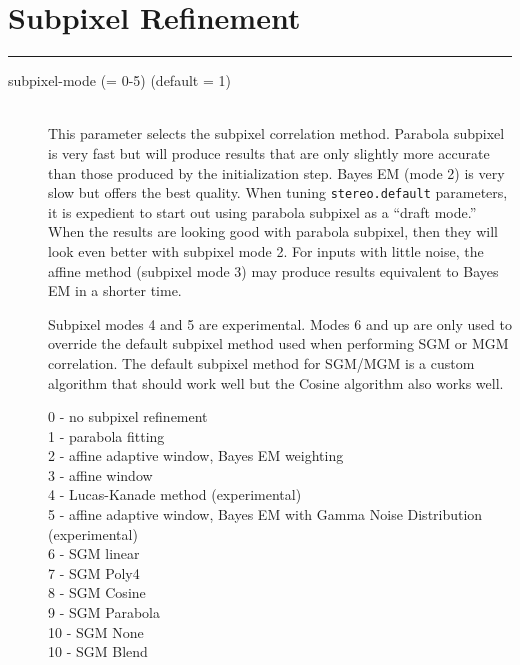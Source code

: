 \section{Subpixel Refinement}
\hrule
\bigskip

\begin{description}

\item[subpixel-mode \textnormal{\small{(= 0-5)}} (default = 1)] \hfill \\
  This parameter selects the subpixel correlation method. Parabola subpixel
  is very fast but will produce results that are only slightly more accurate
   than those produced by the initialization step. Bayes EM (mode 2)
  is very slow but offers the best quality. When tuning {\tt stereo.default}
  parameters, it is expedient to start out using parabola subpixel as a
  ``draft mode.'' When the results are looking good with parabola subpixel,
  then they  will look even better with subpixel mode 2.  For inputs with
  little noise, the affine method (subpixel mode 3) may produce results
  equivalent to Bayes EM in a shorter time.
  
  Subpixel modes 4 and 5 are experimental.  Modes 6 and up are only used to
  override the default subpixel method used when performing SGM or MGM 
  correlation.  The default subpixel method for SGM/MGM is a custom 
  algorithm that should work well but the Cosine algorithm also works well.

  \begin{description}
    \item[0 - no subpixel refinement]
    \item[1 - parabola fitting ]
    \item[2 - affine adaptive window, Bayes EM weighting ]
    \item[3 - affine window ]
    \item[4 - Lucas-Kanade method (experimental)]
    \item[5 - affine adaptive window, Bayes EM with Gamma Noise Distribution (experimental) ]
    \item[6 - SGM linear ]
    \item[7 - SGM Poly4 ]
    \item[8 - SGM Cosine ]
    \item[9 - SGM Parabola ]
    \item[10 - SGM None ]
    \item[10 - SGM Blend ]
  \end{description}


\end{description}

